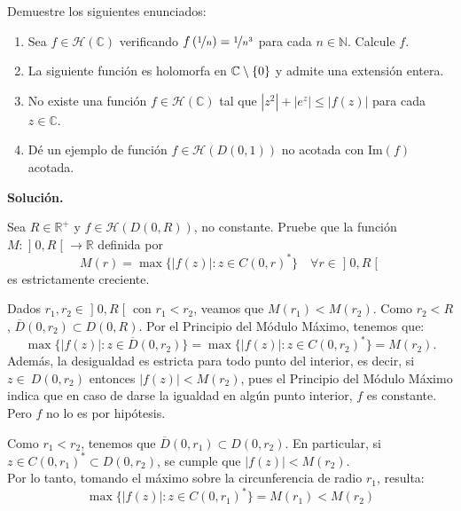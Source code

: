 \documentclass[12pt]{article}
\begin{document}
    \begin{ejercicio}
        Demuestre los siguientes enunciados:
        \begin{enumerate}
            \item Sea $f \in \mathcal{H}(\mathbb{C})$ verificando $f\left(\nicefrac{1}{n}\right) = \nicefrac{1}{n^3}$ para cada $n \in \mathbb{N}$. Calcule $f$.
            \item La siguiente función es holomorfa en $\mathbb{C}\setminus \{0\}$ y admite una extensión entera.
            \item No existe una función $f \in \mathcal{H}(\mathbb{C})$ tal que $|z^2| + |e^z| \le |f(z)|$ para cada $z \in \mathbb{C}$.
            \item Dé un ejemplo de función $f \in \mathcal{H}(D(0, 1))$ no acotada con $\text{Im}(f)$ acotada.
        \end{enumerate}
    \end{ejercicio}

    \newpage
    \noindent
    \textbf{Solución.}
    \setcounter{ejercicio}{0} %

    \begin{ejercicio}[1.5 puntos]
        Sea $R \in \mathbb{R}^+$ y $f \in \mathcal{H}(D(0, R))$, no constante. Pruebe que la función $M \colon \mathopen{]}0, R\mathclose{[} \longrightarrow \mathbb{R}$ definida por
        \[ M(r) = \max \{|f(z)| : z \in C(0, r)^*\} \quad \forall r \in \mathopen{]}0, R\mathclose{[} \]
        es estrictamente creciente.
        
        \bigskip
        Dados $r_1, r_2 \in \mathopen{]}0,R\mathclose{[}$ con $r_1 < r_2$, veamos que $M(r_1) < M(r_2)$. Como $r_2 < R$, $\overline{D}(0,r_2) \subset D(0,R)$. Por el Principio del Módulo Máximo, tenemos que:
        \[ \max\{|f(z)| : z \in \overline{D}(0,r_2)\} = \max\{|f(z)| : z \in C(0,r_2)^*\} = M(r_2). \]
        Además, la desigualdad es estricta para todo punto del interior, es decir, si $z \in~D(0,r_2)$ entonces $|f(z)| < M(r_2)$, pues el Principio del Módulo Máximo indica que en caso de darse la igualdad en algún punto interior, $f$ es constante. Pero $f$ no lo es por hipótesis.

        Como $r_1 < r_2$, tenemos que $\overline{D}(0,r_1) \subset D(0,r_2)$. En particular, si $z \in C(0,r_1)^* \subset D(0,r_2)$, se cumple que $|f(z)| < M(r_2)$.\\

        Por lo tanto, tomando el máximo sobre la circunferencia de radio $r_1$, resulta:
        \[ \max\{|f(z)| : z \in C(0,r_1)^*\} = M(r_1) < M(r_2) \]
    \end{ejercicio}
\end{document}
